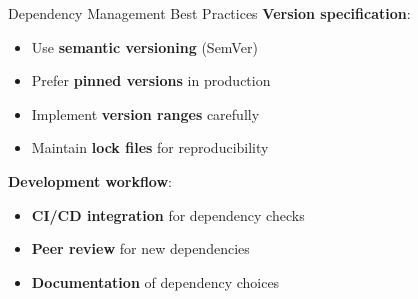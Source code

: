 \documentclass{beamer}
\begin{document}
\begin{frame}[t]{Dependency Management Best Practices}
\textbf{Version specification}:
\begin{itemize}
\item Use \textbf{semantic versioning} (SemVer)
\item Prefer \textbf{pinned versions} in production
\item Implement \textbf{version ranges} carefully
\item Maintain \textbf{lock files} for reproducibility
\end{itemize}

\bigskip


\bigskip

\textbf{Development workflow}:
\begin{itemize}
\item \textbf{CI/CD integration} for dependency checks
\item \textbf{Peer review} for new dependencies
\item \textbf{Documentation} of dependency choices
\end{itemize}
\end{frame}
\end{document}
